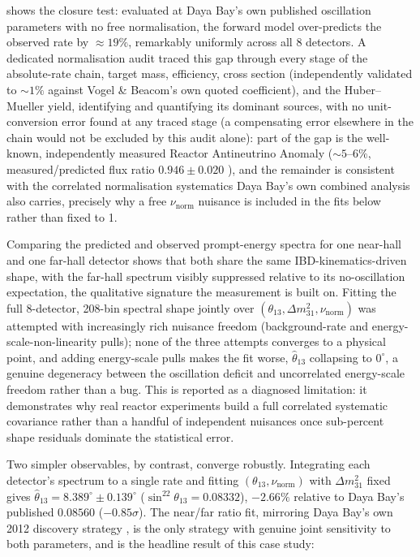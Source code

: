  shows the closure test: evaluated at Daya Bay's own published oscillation parameters with no free normalisation, the forward model over-predicts the observed rate by \(\approx19\%\), remarkably uniformly across all 8 detectors. A dedicated normalisation audit traced this gap through every stage of the absolute-rate chain, target mass, efficiency, cross section (independently validated to \(\sim1\%\) against Vogel \& Beacom's own quoted coefficient), and the Huber--Mueller yield, identifying and quantifying its dominant sources, with no unit-conversion error found at any traced stage (a compensating error elsewhere in the chain would not be excluded by this audit alone): part of the gap is the well-known, independently measured Reactor Antineutrino Anomaly (\(\sim5\)--\(6\%\), measured/predicted flux ratio \(0.946\pm0.020\) \parencite{An2017DayaBayFluxSpectrum}), and the remainder is consistent with the correlated normalisation systematics Daya Bay's own combined analysis also carries, precisely why a free \(\nu_{\mathrm{norm}}\) nuisance is included in the fits below rather than fixed to 1.

Comparing the predicted and observed prompt-energy spectra for one near-hall and one far-hall detector shows that both share the same IBD-kinematics-driven shape, with the far-hall spectrum visibly suppressed relative to its no-oscillation expectation, the qualitative signature the measurement is built on. Fitting the full 8-detector, 208-bin spectral shape jointly over \((\theta_{13},\Delta m^2_{31},\nu_{\mathrm{norm}})\) was attempted with increasingly rich nuisance freedom (background-rate and energy-scale-non-linearity pulls); none of the three attempts converges to a physical point, and adding energy-scale pulls makes the fit worse, \(\hat\theta_{13}\) collapsing to \(0^\circ\), a genuine degeneracy between the oscillation deficit and uncorrelated energy-scale freedom rather than a bug. This is reported as a diagnosed limitation: it demonstrates why real reactor experiments build a full correlated systematic covariance rather than a handful of independent nuisances once sub-percent shape residuals dominate the statistical error.

Two simpler observables, by contrast, converge robustly. Integrating each detector's spectrum to a single rate and fitting \((\theta_{13},\nu_{\mathrm{norm}})\) with \(\Delta m^2_{31}\) fixed gives \(\hat\theta_{13}=8.389^\circ\pm0.139^\circ\) (\(\sin^22\theta_{13}=0.08332\)), \(-2.66\%\) relative to Daya Bay's published \(0.08560\) (\(-0.85\sigma\)). The near/far ratio fit, mirroring Daya Bay's own 2012 discovery strategy \parencite{An2012DayaBayDiscovery}, is the only strategy with genuine joint sensitivity to both parameters, and is the headline result of this case study:

